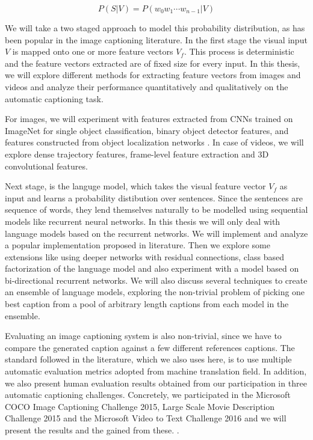 \begin{equation}
\label{eq:langB1} P(S|V) = P(w_0 w_1 \cdots w_{n-1}|V)
\end{equation}

We will take a two staged approach to model this probability distribution, as
has been popular in the image captioning literature. In the first stage the
visual input $V$ is mapped onto one or more feature vectors $V_f$. This process
is deterministic and the feature vectors extracted are of fixed size for every
input. In this thesis, we will explore different methods for extracting feature
vectors from images and videos and analyze their performance quantitatively and
qualitatively on the automatic captioning task. 

For images, we will experiment with features extracted from CNNs trained on
ImageNet for single object classification, binary object detector features, and
features constructed from object localization networks .
In case of videos, we will explore dense trajectory features, frame-level
feature extraction and 3D convolutional features. 

Next stage, is the languge model, which takes the visual feature vector $V_f$ as
input and learns a probability distibution over sentences. Since the sentences
are sequence of words, they lend themselves naturally to be modelled using
sequential models like recurrent neural networks. In this thesis we will only
deal with language models based on the recurrent networks. We will implement and
analyze a popular implementation proposed in literature. Then we explore some
extensions like using deeper networks with residual connections, class based
factorization of the language model and also experiment with a model based on
bi-directional recurrent networks. We will also discuss several techniques to
create an ensemble of language models, exploring the non-trivial problem of
picking one best caption from a pool of arbitrary length captions from each
model in the ensemble.

Evaluating an image captioning system is also non-trivial, since we have to
compare the generated caption against a few different references captions. The
standard  followed in the literature, which we also uses here, is
to use multiple automatic evaluation metrics adopted from machine translation
field. In addition, we also present human evaluation results obtained from our
participation in three automatic captioning challenges. Concretely, we
participated in the Microsoft COCO Image Captioning Challenge 2015, Large Scale
Movie Description Challenge 2015 and the Microsoft Video to Text Challenge 2016
and we will present the results and the  gained from these.
.


